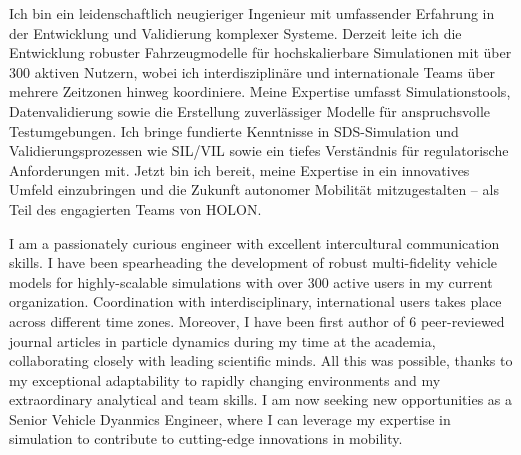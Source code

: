 \documentclass{classic}
\begin{document}
{\rlap{\color{templateColor4}\rule[0mm]{\textwidth}{\ulinewidth}}}
\setlength{\columnsep}{2.5em}
\setlength{\columnseprule}{\ulinewidth}
\begin{paracol}{2}
    {

        Ich bin ein leidenschaftlich neugieriger Ingenieur mit umfassender
        Erfahrung in der Entwicklung und Validierung komplexer Systeme. Derzeit
        leite ich die Entwicklung robuster Fahrzeugmodelle für hochskalierbare
        Simulationen mit \"uber 300 aktiven Nutzern, wobei ich interdisziplinäre
        und internationale Teams über mehrere Zeitzonen hinweg koordiniere.
        Meine Expertise umfasst Simulationstools, Datenvalidierung sowie die
        Erstellung zuverlässiger Modelle f\"ur anspruchsvolle Testumgebungen. Ich
        bringe fundierte Kenntnisse in SDS-Simulation und Validierungsprozessen
        wie SIL/VIL sowie ein tiefes Verst\"andnis für regulatorische Anforderungen
        mit. Jetzt bin ich bereit, meine Expertise in ein innovatives Umfeld
        einzubringen und die Zukunft autonomer Mobilität mitzugestalten – als
        Teil des engagierten Teams von HOLON.

    } 
    { 


        I am a passionately curious engineer with excellent intercultural
        communication skills. I have been spearheading the development of
        robust multi-fidelity vehicle models for highly-scalable simulations
        with over 300 active users in my current organization. Coordination
        with interdisciplinary, international users takes place across
        different time zones. Moreover, I have been first author of 6
        peer-reviewed journal articles in particle dynamics during my time at
        the academia, collaborating closely with leading scientific minds. All
        this was possible, thanks to my exceptional adaptability to rapidly
        changing environments and my extraordinary analytical and team skills.
        I am now seeking new opportunities as a Senior Vehicle Dyanmics
        Engineer, where I can leverage my expertise in simulation to contribute
        to cutting-edge innovations in mobility.\\

    }


\end{paracol}
\end{document}
